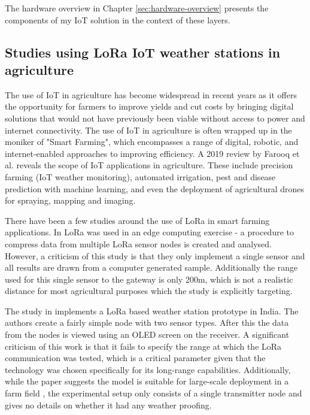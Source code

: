 The hardware overview in Chapter \ref{sec:hardware-overview} presents the
components of my IoT solution in the context of these layers.

\subsection{Studies using LoRa IoT weather stations in agriculture}

The use of IoT in agriculture has become widespread in recent years as it offers
the opportunity for farmers to improve yields and cut costs by bringing digital
solutions that would not have previously been viable without access to power and
internet connectivity. The use of IoT in agriculture is often wrapped up in the
moniker of "Smart Farming", which encompasses a range of digital, robotic, and
internet-enabled approaches to improving efficiency. A 2019 review by Farooq et
al. \cite{farooq2019iot} reveals the scope of IoT applications in agriculture.
These include precision farming (IoT weather monitoring), automated irrigation,
pest and disease prediction with machine learning, and even the deployment of
agricultural drones for spraying, mapping and imaging.

There have been a few studies around the use of LoRa in smart farming
applications. In \cite{edgeAiGiaEtAl} LoRa was used in an edge computing
exercise - a procedure to compress data from multiple LoRa sensor nodes is
created and analysed. However, a criticism of this study is that they only
implement a single sensor and all results are drawn from a computer generated
sample. Additionally the range used for this single sensor to the gateway is
only 200m, which is not a realistic distance for most agricultural purposes
which the study is explicitly targeting.

The study in \cite{smartFarmKodaliEtAl} implements a LoRa based weather station
prototype in India. The authors create a fairly simple node with two sensor
types. After this the data from the nodes is viewed using an OLED screen on the
receiver. A significant criticism of this work is that it fails to specify the
range at which the LoRa communication was tested, which is a critical parameter
given that the technology was chosen specifically for its long-range
capabilities. Additionally, while the paper suggests the model is suitable for
large-scale deployment in a farm field , the experimental setup only consists of
a single transmitter node and gives no details on whether it had any weather
proofing.

